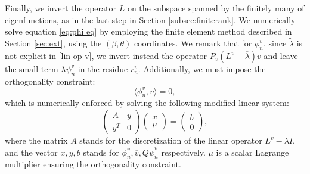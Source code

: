 \documentclass[11pt,a4paper]{article}
\numberwithin{equation}{section}
\begin{document}
Finally, we invert the operator $L$ on the subspace spanned by the finitely many of eigenfunctions, as in the last step in
Section \ref{subsec:finiterank}. We numerically solve equation \eqref{eq:phi
eq} by employing the finite element method described in Section \ref{sec:ext},
using the $(\beta, \theta)$ coordinates. We remark that for $\phi_n^v$, since
$\widetilde{\lambda}$ is not explicit in \eqref{lin op v}, we invert instead
the operator $P_{\overline{v}}(L^v - \overline{\lambda}) v$ and leave the small term
$\lambda \psi^v_n$ in the residue $r_n^v$. Additionally, we must
impose the orthogonality constraint:
\[ \langle \phi_n^v, \overline{v} \rangle = 0, \]
which is numerically enforced by solving the following modified linear system:
\[ \left( \begin{array}{cc}
     A & y\\
     y^T & 0
   \end{array} \right) \left( \begin{array}{c}
     x\\
     \mu
   \end{array} \right) = \left( \begin{array}{c}
     b\\
     0
   \end{array} \right), \]
where the matrix $A$ stands for the discretization of the linear operator $L^v - \overline{\lambda} I$, and
the vector $x, y, b$ stands for $\phi^v_n, \overline{v}, Q \overline{\psi}_n^v$
respectively. $\mu$ is a scalar Lagrange multiplier ensuring the orthogonality
constraint. 
\end{document}
